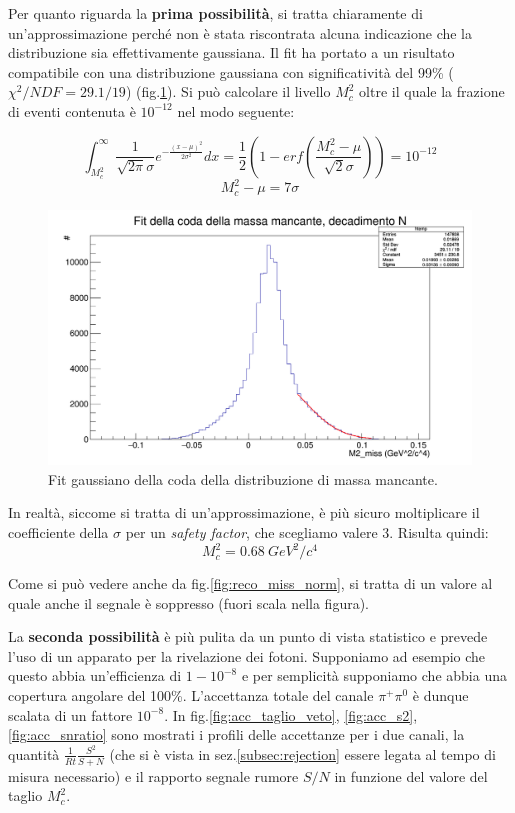 \documentclass[8pt]{extarticle}
\begin{document}
Per quanto riguarda la \textbf{prima possibilità}, si tratta chiaramente di un'approssimazione perché non è stata riscontrata alcuna indicazione che la distribuzione sia effettivamente gaussiana. Il fit ha portato a un risultato compatibile con una distribuzione gaussiana con significatività del 99\% ($\chi^2/NDF = 29.1/19$) (fig.\ref{fig:reco_miss_N_fit}). Si può calcolare il livello $M^2_c$ oltre il quale la frazione di eventi contenuta è $10^{-12}$ nel modo seguente:

$$
\int_{M^2_c}^{\infty} \frac{1}{\sqrt{2\pi}\sigma} e^{-\frac{(x-\mu)^2}{2\sigma^2}} dx = \frac{1}{2}(1 - erf(\frac{M^2_c-\mu}{\sqrt{2}\sigma})) = 10^{-12}
$$
$$
M^2_c - \mu = 7\sigma
$$

 \begin{figure}
 \begin{center}
 	\includegraphics[scale=0.25]{reco_miss_N_fit}
 	\caption{Fit gaussiano della coda della distribuzione di massa mancante.}
 	\label{fig:reco_miss_N_fit}
 \end{center}
 \end{figure}

In realtà, siccome si tratta di un'approssimazione, è più sicuro moltiplicare il coefficiente della $\sigma$ per un \textit{safety factor}, che scegliamo valere 3. Risulta quindi: 
$$
M^2_c = 0.68\ GeV^2/c^4
$$ 

Come si può vedere anche da fig.\ref{fig:reco_miss_norm}, si tratta di un valore al quale anche il segnale è soppresso (fuori scala nella figura).

La \textbf{seconda possibilità} è più pulita da un punto di vista statistico e prevede l'uso di un apparato per la rivelazione dei fotoni. Supponiamo ad esempio che questo abbia un'efficienza di $1 - 10^{-8}$ e per semplicità supponiamo che abbia una copertura angolare del 100\%. L'accettanza totale del canale $\pi^+ \pi^0$ è dunque scalata di un fattore $10^{-8}$. In fig.\ref{fig:acc_taglio_veto}, \ref{fig:acc_s2}, \ref{fig:acc_snratio} sono mostrati i profili delle accettanze per i due canali, la quantità $\frac{1}{Rt} \frac{S^2}{S+N}$ (che si è vista in sez.\ref{subsec:rejection} essere legata al tempo di misura necessario) e il rapporto segnale rumore $S/N$ in funzione del valore del taglio $M^2_c$.
\end{document}
